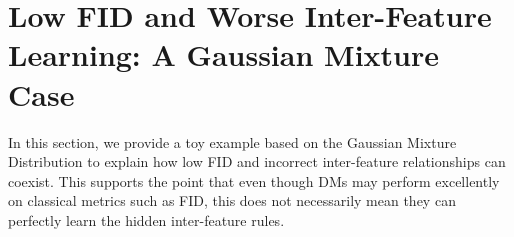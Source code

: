 \appendix

 \onecolumn



\section{Low FID and Worse Inter-Feature Learning: A Gaussian Mixture Case}
\label{app:Low FID and Worse Inter-Feature Leaning: A Gaussian Mixture Case}

In this section, we provide a toy example based on the Gaussian Mixture Distribution to explain how low FID and incorrect inter-feature relationships can coexist. This supports the point that even though DMs may perform excellently on classical metrics such as FID, this does not necessarily mean they can perfectly learn the hidden inter-feature rules.

